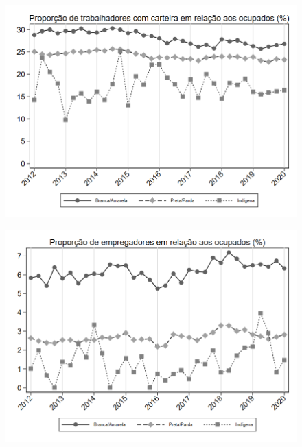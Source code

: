 \begin{frame}[label=_composicao_demografica_raca_prop_empregadoCC]{}
\textit{\hyperlink{_composicao_demografica_raca}{}}
\begin{figure}
  \centering
  \includegraphics[width=1.0\linewidth]{../../analysis/output/composicao_demografica/raca/_composicao_demografica_raca_prop_empregadoCC.png}
  \caption{}
  \label{fig:_composicao_demografica_raca_prop_empregadoCC}
\end{figure}
\end{frame}

\begin{frame}[label=_composicao_demografica_raca_prop_empregador]{}
\textit{\hyperlink{_composicao_demografica_raca}{}}
\begin{figure}
  \centering
  \includegraphics[width=1.0\linewidth]{../../analysis/output/composicao_demografica/raca/_composicao_demografica_raca_prop_empregador.png}
  \caption{}
  \label{fig:_composicao_demografica_raca_prop_empregador}
\end{figure}
\end{frame}



